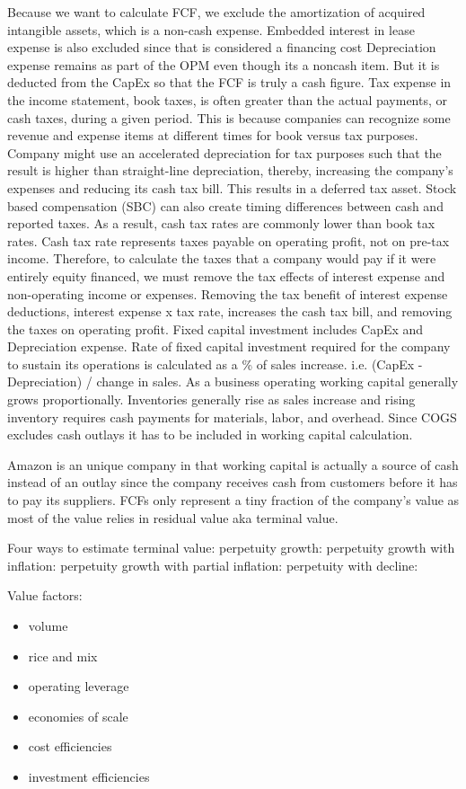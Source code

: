 \documentclass[english,titlepage]{article}
\begin{document}
Because we want to calculate FCF, we exclude the amortization of acquired intangible assets, which is a non-cash expense. 
Embedded interest in lease expense is also excluded since that is considered a financing cost
Depreciation expense remains as part of the OPM even though its a noncash item. But it is deducted from the CapEx so that the FCF is truly a cash figure. 
Tax expense in the income statement, book taxes, is often greater than the actual payments, or cash taxes, during a given period. This is because companies can recognize some revenue and expense items at different times for book versus tax purposes. 
Company might use an accelerated depreciation for tax purposes such that the result is higher than straight-line depreciation, thereby, increasing the company's expenses and reducing its cash tax bill. This results in a deferred tax asset.
Stock based compensation (SBC) can also create timing differences between cash and reported taxes. As a result, cash tax rates are commonly lower than book tax rates. 
Cash tax rate represents taxes payable on operating profit, not on pre-tax income. Therefore, to calculate the taxes that a company would pay if it were entirely equity financed, we must remove the tax effects of interest expense and non-operating income or expenses. 
Removing the tax benefit of interest expense deductions, interest expense x tax rate, increases the cash tax bill, and removing the taxes on operating profit. 
Fixed capital investment includes CapEx and Depreciation expense. Rate of fixed capital investment required for the company to sustain its operations is calculated as a \% of sales increase. i.e. (CapEx - Depreciation) / change in sales. 
As a business operating working capital generally grows proportionally. 
Inventories generally rise as sales increase and rising inventory requires cash payments for materials, labor, and overhead. Since COGS excludes cash outlays it has to be included in working capital calculation. 

\begin{tcolorbox}[colback=blue!5!white,colframe=blue!75!black]
Amazon is an unique company in that working capital is actually a source of cash instead of an outlay since the company receives cash from customers before it has to pay its suppliers. 
\vspace {0.3 cm}
  \newline
FCFs only represent a tiny fraction of the company's value as most of the value relies in residual value aka terminal value. 
\end{tcolorbox}

Four ways to estimate terminal value: 
perpetuity growth: 
perpetuity growth with inflation:
perpetuity growth with partial inflation:
perpetuity with decline:

Value factors: 
\begin{itemize}
    \item  volume
    \item rice and mix
    \item operating leverage
    \item economies of scale
    \item cost efficiencies
    \item investment efficiencies
\end{itemize}
\end{document}
